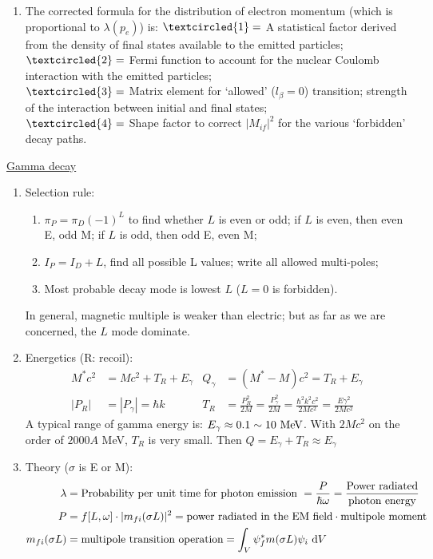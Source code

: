 \documentclass{school-22.101-notes}
\begin{document}
\begin{enumerate}
\item The corrected formula for the distribution of electron momentum (which is proportional to $\lambda(p_e)$) is:
$\textcircled{1}=$ A statistical factor derived from the density of final states available to the emitted particles; \\
$\textcircled{2}=$ Fermi function to account for the nuclear Coulomb interaction with the emitted particles;\\
$\textcircled{3}=$ Matrix element for `allowed' ($l_{\beta} = 0$) transition; strength of the interaction between initial and final states; \\
$\textcircled{4}=$ Shape factor to correct $|M_{if}|^2$ for the various `forbidden' decay paths.    
\end{enumerate}




\clearpage
\uline{Gamma decay}
\begin{enumerate}
\item Selection rule:
    \begin{enumerate}
    \item  $\pi_P = \pi_D (-1)^L$ to find whether $L$ is even or odd; if $L$ is even, then even E, odd M; if $L$ is odd, then odd E, even M;
    \item $I_P = I_D + L$, find all possible L values; write all allowed multi-poles;
    \item Most probable decay mode is lowest $L$ ($L=0$ is forbidden). 
    \end{enumerate}
    In general, magnetic multiple is weaker than electric; but as far as we are concerned, the $L$ mode dominate. 
\item Energetics (R: recoil):
\begin{align}
M^* c^2 &= Mc^2 + T_R + E_{\gamma}  & Q_{\gamma} &=  (M^* - M)c^2  = T_R + E_{\gamma} \\
|P_R| &= |P_{\gamma}| = \hbar k & T_R &= \frac{P_R^2}{2M} = \frac{P_{\gamma}^2}{2M} = \frac{\hbar^2 k^2 c^2}{2Mc^2} = \frac{E \gamma^2}{2Mc^2} 
\end{align}
A typical range of gamma energy is: $E_{\gamma} \approx 0.1 \sim 10 \mbox{ } \mathrm{MeV}$. With $2Mc^2$ on the order of $2000 A$ MeV, $T_R$ is very small. Then $Q = E_{\gamma} + T_R \approx E_{\gamma}$
\item Theory ($\sigma$ is E or M): 
\begin{align}
\lambda &= \mbox{Probability per unit time for photon emission } = \frac{P}{\hbar \omega} = \frac{\mbox{Power radiated}}{\mbox{photon energy}} \\
P&= f[L,\omega] \cdot |m_{fi} (\sigma L)|^2 = \mbox{power radiated in the EM field} \cdot \mbox{multipole moment} \\
m_{fi} (\sigma L) &= \mbox{multipole transition operation} = \int_V \psi_f^* m(\sigma L) \psi_i \mbox{ }\mathrm{d} V 
\end{align}
\end{enumerate}
\end{document}
